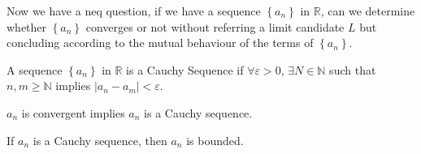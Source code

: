 Now we have a neq question, if we have a sequence \(\left\{ a_n \right\} \) in \(\mathbb{R} \), can we determine whether \(\left\{ a_n \right\} \) converges or not without referring a limit candidate \(L\) but concluding according to the mutual behaviour of the terms of \(\left\{ a_n \right\} \). 

\begin{definition}
    A sequence \(\left\{ a_n \right\} \) in \(\mathbb{R} \) is a Cauchy Sequence if \(\forall \varepsilon > 0\), \(\exists N \in \mathbb{N} \) such that \(n, m \ge \mathbb{N} \) implies \(\left\vert a_n - a_m \right\vert < \varepsilon \).      
\end{definition}
\begin{exercise}
    \(a_n\) is convergent implies \(a_n\) is a Cauchy sequence.  
\end{exercise}
\begin{exercise}
    If \(a_n\) is a Cauchy sequence, then \(a_n\) is bounded.  
\end{exercise}

